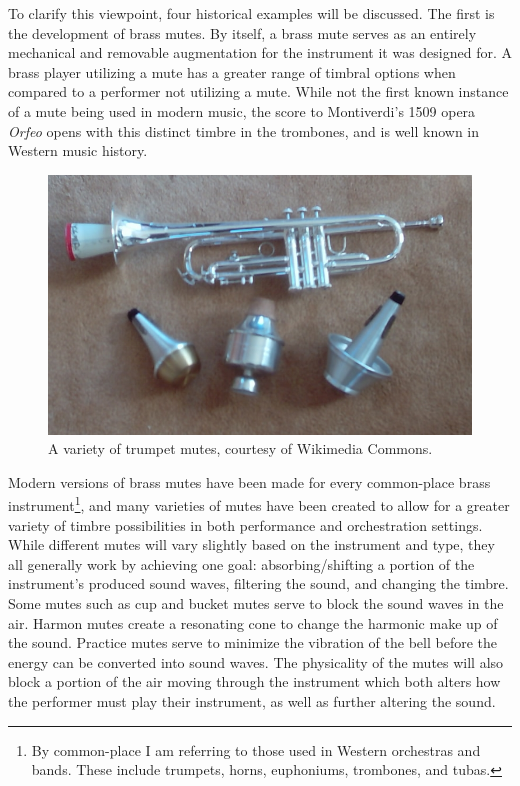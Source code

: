 To clarify this viewpoint, four historical examples will be discussed. The first is the development of brass mutes. By itself, a brass mute serves as an entirely mechanical and removable augmentation for the instrument it was designed for. A brass player utilizing a mute has a greater range of timbral options when compared to a performer not utilizing a mute. While not the first known instance of a mute being used in modern music, the score to Montiverdi's 1509 opera \textit{Orfeo} opens with this distinct timbre in the trombones, and is well known in Western music history.

\begin{figure}
    \centering
    \includegraphics[scale=0.35]{diagrams/TrumpetMutes.jpg}
    \caption{A variety of trumpet mutes, courtesy of Wikimedia Commons.} %
    \label{fig:tptmutes}
\end{figure}

Modern versions of brass mutes have been made for every common-place brass instrument\footnote{By common-place I am referring to those used in Western orchestras and bands. These include trumpets, horns, euphoniums, trombones, and tubas.}, and many varieties of mutes have been created to allow for a greater variety of timbre possibilities in both performance and orchestration settings. While different mutes will vary slightly based on the instrument and type, they all generally work by achieving one goal: absorbing/shifting a portion of the instrument's produced sound waves, filtering the sound, and changing the timbre. Some mutes such as cup and bucket mutes serve to block the sound waves in the air. Harmon mutes create a resonating cone to change the harmonic make up of the sound. Practice mutes serve to minimize the vibration of the bell before the energy can be converted into sound waves. The physicality of the mutes will also block a portion of the air moving through the instrument which both alters how the performer must play their instrument, as well as further altering the sound\cite{brassMutes1982}.

